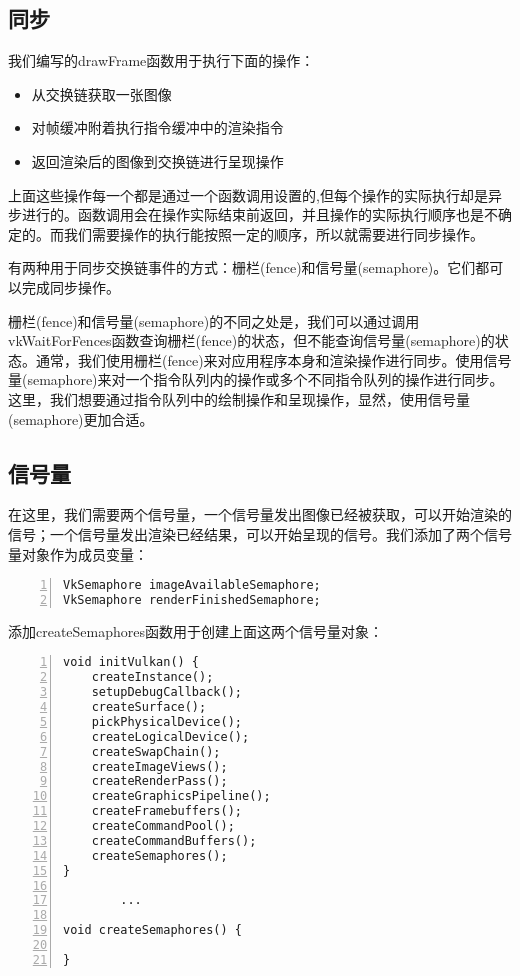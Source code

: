 \documentclass{ctexart}
\begin{document}
\subsection{同步}

我们编写的drawFrame函数用于执行下面的操作：

\begin{itemize}
	\item 从交换链获取一张图像
	\item 对帧缓冲附着执行指令缓冲中的渲染指令
	\item 返回渲染后的图像到交换链进行呈现操作
\end{itemize}

上面这些操作每一个都是通过一个函数调用设置的,但每个操作的实际执行却是异步进行的。函数调用会在操作实际结束前返回，并且操作的实际执行顺序也是不确定的。而我们需要操作的执行能按照一定的顺序，所以就需要进行同步操作。

有两种用于同步交换链事件的方式：栅栏(fence)和信号量(semaphore)。它们都可以完成同步操作。

栅栏(fence)和信号量(semaphore)的不同之处是，我们可以通过调用vkWaitForFences函数查询栅栏(fence)的状态，但不能查询信号量(semaphore)的状态。通常，我们使用栅栏(fence)来对应用程序本身和渲染操作进行同步。使用信号量(semaphore)来对一个指令队列内的操作或多个不同指令队列的操作进行同步。这里，我们想要通过指令队列中的绘制操作和呈现操作，显然，使用信号量(semaphore)更加合适。

\subsection{信号量}

在这里，我们需要两个信号量，一个信号量发出图像已经被获取，可以开始渲染的信号；一个信号量发出渲染已经结果，可以开始呈现的信号。我们添加了两个信号量对象作为成员变量：

\begin{lstlisting}[language={[ANSI]C},keywordstyle=\color{blue!70},commentstyle=\color{red!50!green!50!blue!50},frame=shadowbox, rulesepcolor=\color{red!20!green!20!blue!20},basicstyle=\small,numbers=left, numberstyle=\tiny,breaklines=true]
VkSemaphore imageAvailableSemaphore;
VkSemaphore renderFinishedSemaphore;
\end{lstlisting}

添加createSemaphores函数用于创建上面这两个信号量对象：

\begin{lstlisting}[language={[ANSI]C},keywordstyle=\color{blue!70},commentstyle=\color{red!50!green!50!blue!50},frame=shadowbox, rulesepcolor=\color{red!20!green!20!blue!20},basicstyle=\small,numbers=left, numberstyle=\tiny,breaklines=true]
void initVulkan() {
	createInstance();
	setupDebugCallback();
	createSurface();
	pickPhysicalDevice();
	createLogicalDevice();
	createSwapChain();
	createImageViews();
	createRenderPass();
	createGraphicsPipeline();
	createFramebuffers();
	createCommandPool();
	createCommandBuffers();
	createSemaphores();
}

		...

void createSemaphores() {

}
\end{lstlisting}
\end{document}
